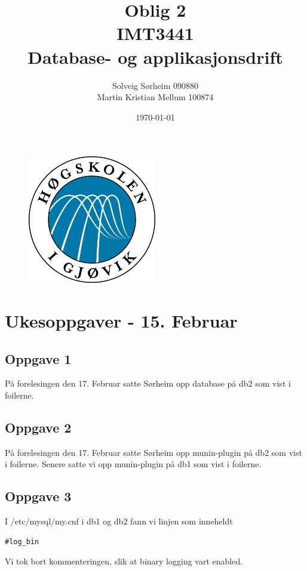 \documentclass[a4paper, norsk, 12pt]{article}
\title{Oblig 2 \\ IMT3441 \\ Database- og applikasjonsdrift}
\author{Solveig Sørheim 090880 \\ Martin Kristian Mellum 100874}
\date{\today}
\begin{document}
\begin{figure}[h!]
 \centering
  \includegraphics[width=0.5\textwidth]{Images/hig_logo.png}
 \maketitle       %
\end{figure}
\pagebreak
\tableofcontents %
\pagebreak	%


\section{Ukesoppgaver - 15. Februar}
\subsection{Oppgave 1}
På forelesingen den 17. Februar satte Sørheim opp database på db2 som vist i foilerne.

\subsection{Oppgave 2}
På forelesingen den 17. Februar satte Sørheim opp munin-plugin på db2 som vist i foilerne. Senere satte vi opp munin-plugin på db1 som vist i foilerne.

\subsection{Oppgave 3}
I /etc/mysql/my.cnf i db1 og db2 fann vi linjen som inneheldt
\begin{verbatim}
#log_bin
\end{verbatim}
Vi tok bort kommenteringen, slik at binary logging vart enabled.
\end{document}
